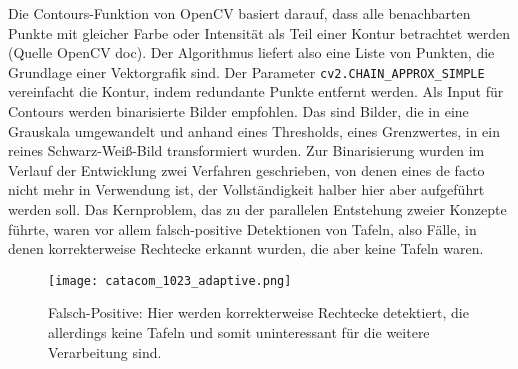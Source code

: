 Die Contours-Funktion von OpenCV basiert darauf, dass alle benachbarten Punkte mit gleicher Farbe oder Intensität als Teil einer Kontur betrachtet werden (Quelle OpenCV doc). Der Algorithmus liefert also eine Liste von Punkten, die Grundlage einer Vektorgrafik sind. Der Parameter \verb|cv2.CHAIN_APPROX_SIMPLE| vereinfacht die Kontur, indem redundante Punkte entfernt werden. Als Input für Contours werden binarisierte Bilder empfohlen. Das sind Bilder, die in eine Grauskala umgewandelt  und anhand eines Thresholds, eines Grenzwertes, in ein reines Schwarz-Weiß-Bild transformiert wurden. Zur Binarisierung wurden im Verlauf der Entwicklung zwei Verfahren geschrieben, von denen eines de facto nicht mehr in Verwendung ist, der Vollständigkeit halber hier aber aufgeführt werden soll.
Das Kernproblem, das zu der parallelen Entstehung zweier Konzepte führte, waren vor allem falsch-positive Detektionen von Tafeln, also Fälle, in denen korrekterweise Rechtecke erkannt wurden, die aber keine Tafeln waren.


\begin{SCfigure}[0.5][h!]
\caption{Falsch-Positive: Hier werden korrekterweise Rechtecke detektiert, die allerdings keine Tafeln und somit uninteressant für die weitere Verarbeitung sind.}
\texttt{[image: catacom\_1023\_adaptive.png]}
\end{SCfigure}

